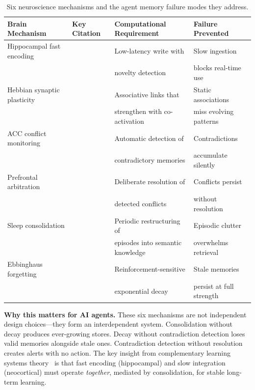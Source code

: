 \documentclass{article}
\begin{document}
\begin{table}[h]
\centering
\caption{Six neuroscience mechanisms and the agent memory failure modes they address.}
\label{tab:neuro_spec}
\small
\begin{tabular}{@{}llll@{}}
\toprule
\textbf{Brain Mechanism} & \textbf{Key Citation} & \textbf{Computational Requirement} & \textbf{Failure Prevented} \\
\midrule
Hippocampal fast encoding & \citet{mcclelland1995} & Low-latency write with & Slow ingestion \\
 & & novelty detection & blocks real-time use \\
\addlinespace
Hebbian synaptic plasticity & \citet{hebb1949} & Associative links that & Static associations \\
 & & strengthen with co-activation & miss evolving patterns \\
\addlinespace
ACC conflict monitoring & \citet{botvinick2004} & Automatic detection of & Contradictions \\
 & & contradictory memories & accumulate silently \\
\addlinespace
Prefrontal arbitration & \citet{miller2001} & Deliberate resolution of & Conflicts persist \\
 & & detected conflicts & without resolution \\
\addlinespace
Sleep consolidation & \citet{diekelmann2010} & Periodic restructuring of & Episodic clutter \\
 & & episodes into semantic knowledge & overwhelms retrieval \\
\addlinespace
Ebbinghaus forgetting & \citet{ebbinghaus1885} & Reinforcement-sensitive & Stale memories \\
 & & exponential decay & persist at full strength \\
\bottomrule
\end{tabular}
\end{table}

\textbf{Why this matters for AI agents.} These six mechanisms are not independent design choices---they form an interdependent system. Consolidation without decay produces ever-growing stores. Decay without contradiction detection loses valid memories alongside stale ones. Contradiction detection without resolution creates alerts with no action. The key insight from complementary learning systems theory~\citep{mcclelland1995} is that fast encoding (hippocampal) and slow integration (neocortical) must operate \emph{together}, mediated by consolidation, for stable long-term learning.
\end{document}

